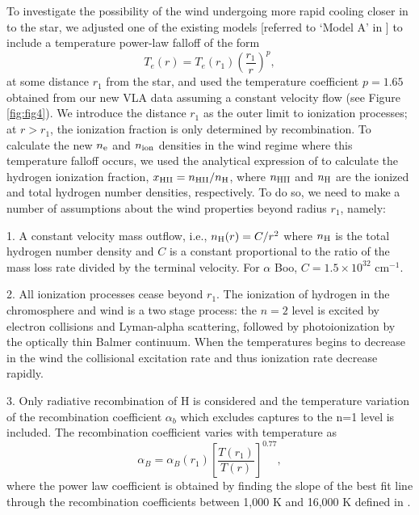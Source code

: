 \documentclass[iop]{emulateapj}
\begin{document}
To investigate the possibility of the wind undergoing more rapid cooling closer in to the star, we adjusted one of the existing models [referred to `Model A' in \cite{1985pssl.proc..351D}] to include a temperature power-law falloff of the form
\begin{equation}
T_{e}(r)= T_{e}(r_{1})\left(\frac{r_{1}}{r}\right)^{p},
\label{eq:eq2}
\end{equation}
at some distance $r_{1}$ from the star, and used the temperature coefficient $p=1.65$ obtained from our new VLA data assuming a constant velocity flow (see Figure \ref{fig:fig4}). We introduce the distance $r_{1}$ as the outer limit to ionization processes; at $r > r_{1}$, the ionization fraction is only determined by recombination. To calculate the new $n_{\rm{e}}$ and $n_{\rm{ion}}$ densities in the wind regime where this temperature falloff occurs, we used the analytical expression of \cite{1986ApJ...306..605G} to calculate the hydrogen ionization fraction, $x_{\rm{HII}}=n_{\rm{HII}}/n_{\rm{H}}$, where $n_{\rm{HII}}$ and $n_{\rm{H}}$ are the ionized and total hydrogen number densities, respectively. To do so, we need to make a number of assumptions about the wind properties beyond radius $r_{1}$, namely:

1. A constant velocity mass outflow, i.e., $n_{\rm{H}}(r)=C/r^2$ where $n_{\rm{H}}$ is the total hydrogen number density and $C$ is a constant proportional to the ratio of the mass loss rate divided by the terminal velocity. For $\alpha$ Boo, $C = 1.5 \times 10^{32} $ cm$^{-1}$.

2. All ionization processes cease beyond $r_{1}$. The ionization of hydrogen in the chromosphere and wind is a two stage process: the $n = 2$ level is excited by electron collisions and Lyman-alpha scattering, followed by photoionization by the optically thin Balmer continuum. When the temperatures begins to decrease in the wind the collisional excitation rate and thus ionization rate decrease rapidly.

3. Only radiative recombination of H is considered and the temperature variation of the recombination coefficient $\alpha _{b}$ which excludes captures to the n=1 level \citep{1978ppim.book.....S} is included. The recombination coefficient varies with temperature as
\begin{equation}
\alpha _{B} = \alpha _{B}(r_{1})\left[\frac{T(r_1)}{T(r)}\right]^{0.77},
\label{eq:eq3}
\end{equation}
where the power law coefficient is obtained by finding the slope of the best fit line through the recombination coefficients between 1,000 K and 16,000 K defined in \cite{1978ppim.book.....S}.
\end{document}
